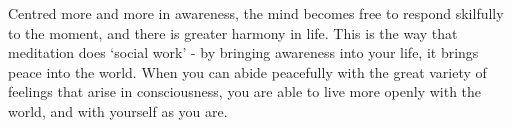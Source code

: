 Centred more and more in awareness, the mind becomes free to respond
skilfully to the moment, and there is greater harmony in life. This is
the way that meditation does `social work' - by bringing awareness into
your life, it brings peace into the world. When you can abide peacefully
with the great variety of feelings that arise in consciousness, you are
able to live more openly with the world, and with yourself as you are.

